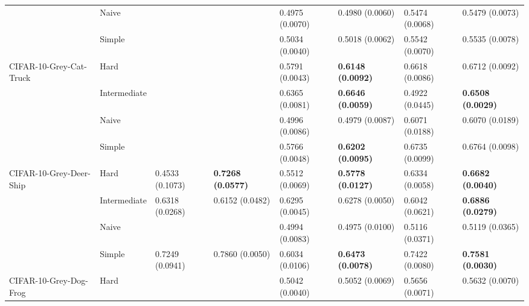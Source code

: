 \begin{tabular}{llllllll}
                 & Naive &                           &                           &           0.4975 (0.0070) &           0.4980 (0.0060) &           0.5474 (0.0068) &           0.5479 (0.0073) \\
                 & Simple &                           &                           &           0.5034 (0.0040) &           0.5018 (0.0062) &           0.5542 (0.0070) &           0.5535 (0.0078) \\
CIFAR-10-Grey-Cat-Truck & Hard &                           &                           &           0.5791 (0.0043) &  \textbf{0.6148 (0.0092)} &           0.6618 (0.0086) &           0.6712 (0.0092) \\
                 & Intermediate &                           &                           &           0.6365 (0.0081) &  \textbf{0.6646 (0.0059)} &           0.4922 (0.0445) &  \textbf{0.6508 (0.0029)} \\
                 & Naive &                           &                           &           0.4996 (0.0086) &           0.4979 (0.0087) &           0.6071 (0.0188) &           0.6070 (0.0189) \\
                 & Simple &                           &                           &           0.5766 (0.0048) &  \textbf{0.6202 (0.0095)} &           0.6735 (0.0099) &           0.6764 (0.0098) \\
CIFAR-10-Grey-Deer-Ship & Hard &           0.4533 (0.1073) &  \textbf{0.7268 (0.0577)} &           0.5512 (0.0069) &  \textbf{0.5778 (0.0127)} &           0.6334 (0.0058) &  \textbf{0.6682 (0.0040)} \\
                 & Intermediate &           0.6318 (0.0268) &           0.6152 (0.0482) &           0.6295 (0.0045) &           0.6278 (0.0050) &           0.6042 (0.0621) &  \textbf{0.6886 (0.0279)} \\
                 & Naive &                           &                           &           0.4994 (0.0083) &           0.4975 (0.0100) &           0.5116 (0.0371) &           0.5119 (0.0365) \\
                 & Simple &           0.7249 (0.0941) &           0.7860 (0.0050) &           0.6034 (0.0106) &  \textbf{0.6473 (0.0078)} &           0.7422 (0.0080) &  \textbf{0.7581 (0.0030)} \\
CIFAR-10-Grey-Dog-Frog & Hard &                           &                           &           0.5042 (0.0040) &           0.5052 (0.0069) &           0.5656 (0.0071) &           0.5632 (0.0070) \\

\end{tabular}
